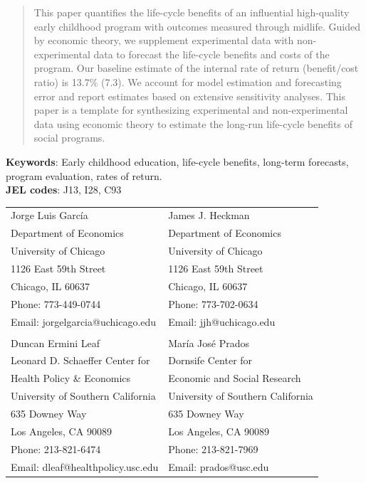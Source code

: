 \bigskip

\begin{abstract}
\noindent This paper quantifies the life-cycle benefits of an influential high-quality early childhood program with outcomes measured through midlife. Guided by economic theory, we supplement experimental data with non-experimental data to forecast the life-cycle benefits and costs of the program. Our baseline estimate of the internal rate of return (benefit/cost ratio) is 13.7\% (7.3). We account for model estimation and forecasting error and report estimates based on extensive sensitivity analyses. This paper is a template for synthesizing experimental and non-experimental data using economic theory to estimate the long-run life-cycle benefits of social programs. 
\end{abstract}

\noindent \textbf{Keywords}: Early childhood education, life-cycle benefits, long-term forecasts, program evaluation, rates of return. \\
\noindent \textbf{JEL codes}: J13, I28, C93\\


\bigskip
\begin{tabular}{ll}
Jorge Luis Garc\'{i}a                                          & James J. Heckman \\
Department of Economics                                 & Department of Economics \\
University of Chicago                                        & University of Chicago \\
1126 East 59th Street                                       & 1126 East 59th Street \\
Chicago, IL 60637                                             & Chicago, IL 60637 \\
Phone: 773-449-0744                                       & Phone: 773-702-0634  \\
Email: jorgelgarcia@uchicago.edu                    & Email: jjh@uchicago.edu \\
                                                                          & \\
Duncan Ermini Leaf                                           & Mar\'{i}a Jos\'{e} Prados \\
Leonard D. Schaeffer Center for                       & Dornsife Center for  \\
Health Policy \& Economics                              & Economic and Social Research \\
University of Southern California                       & University of Southern California \\
635 Downey Way                                              & 635 Downey Way        \\
Los Angeles, CA 90089                                    & Los Angeles, CA 90089 \\
Phone: 213-821-6474                                       & Phone: 213-821-7969 \\
Email: dleaf@healthpolicy.usc.edu                     & Email: prados@usc.edu \\

\end{tabular}

